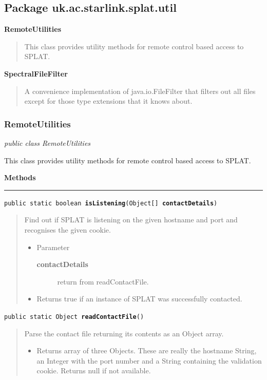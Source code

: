 \documentclass[twoside,11pt]{article}
\newcommand{\htmlref}[2]{#1}
\renewcommand{\_}{\texttt{\symbol{95}}}
\newcommand{\entityintro}[3]{
  \htmlref{\textbf{\Large{#1}}}{#2}
  \dotfill\pageref{#2}
  \begin{quote}
  #3
  \end{quote}
}
\newcommand{\startsection}[4]{
   \subsubsection{\label{#3}{#2}}
   #4
}
\newcommand{\method}[1]{\texttt{#1}}
\newenvironment{desc}{\begin{quote}}{\end{quote}}
\newcommand{\methods}{
   \par\textbf{\large{Methods}}\\
   \hrule
}
\begin{document}
\clearpage


\subsection{Package uk.ac.starlink.splat.util}

\entityintro{RemoteUtilities}{l236}{This class provides utility methods for remote control based
 access to SPLAT.}
\entityintro{SpectralFileFilter}{l237}{A convenience implementation of java.io.FileFilter that filters out
 all files except for those type extensions that it knows about.}
\clearpage
\startsection{Class}{RemoteUtilities}{l236}

\fbox{\parbox{\textwidth}{
\textit{public
 class RemoteUtilities}
}} %





{This class provides utility methods for remote control based
 access to SPLAT.}
\methods
\method{public static boolean \textbf{isListening}(\texttt{Object[]} \textbf{contactDetails})\label{l238}\label{l239}}
\begin{desc}Find out if SPLAT is listening on the given hostname and port
 and recognises the given cookie.
\begin{itemize}
\item{Parameter
  \begin{description}
   \item[\textbf{contactDetails}]{return from readContactFile.}
  \end{description}}
\end{itemize}
\begin{itemize}
\item{Returns true if an instance of SPLAT was successfully contacted. }
\end{itemize}
\end{desc}

\method{public static Object \textbf{readContactFile}()\label{l240}\label{l241}}
\begin{desc}Parse the contact file returning its contents as an Object array.
\begin{itemize}
\item{Returns array of three Objects. These are really the hostname
         String, an Integer with the port number and a String
         containing the validation cookie. Returns null if not
         available. }
\end{itemize}
\end{desc}
\end{document}
